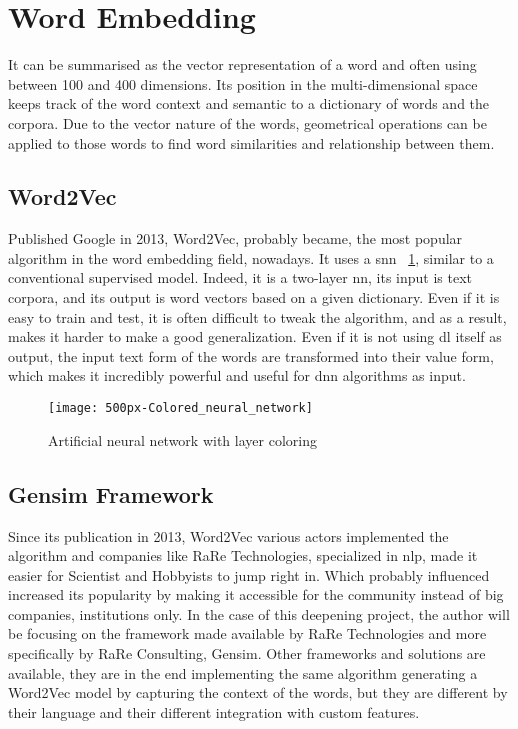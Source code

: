 \section{Word Embedding}
\label{stoa:word-embedding}
It can be summarised as the vector representation of a word and often using between 100 and 400 dimensions. Its position in the multi-dimensional space keeps track of the word context and semantic to a dictionary of words and the corpora. Due to the vector nature of the words, geometrical operations can be applied to those words to find word similarities and relationship between them. 


\subsection{Word2Vec}
\label{stoa:word2vec}
Published Google in 2013, Word2Vec\cite{article:word2vec}, probably became, the most popular algorithm in the word embedding field, nowadays. It uses a \gls{snn} ~\ref{fig:wikipedia_colored_neural_network_img}, similar to a conventional supervised model. Indeed, it is a two-layer \gls{nn}, its input is text corpora, and its output is word vectors based on a given dictionary. Even if it is easy to train and test, it is often difficult to tweak the algorithm, and as a result, makes it harder to make a good generalization. Even if it is not using \gls{dl} itself as output, the input text form of the words are transformed into their value form, which makes it incredibly powerful and useful for \gls{dnn} algorithms as input.

\begin{figure}[ht!]
    \centering
    \texttt{[image: 500px-Colored\_neural\_network]}
    \caption{
       Artificial neural network with layer coloring \cite{wikipedia:colored_neural_network_img}
    }
    \label{fig:wikipedia_colored_neural_network_img}
\end{figure}


\subsection{Gensim Framework}
\label{stoa:gensim}
Since its publication in 2013, Word2Vec\cite{article:word2vec} various actors implemented the algorithm and companies like RaRe Technologies\cite{company:rare-technologies}, specialized in \gls{nlp}, made it easier for Scientist and Hobbyists to jump right in. Which probably influenced increased its popularity by making it accessible for the community instead of big companies, institutions only. In the case of this deepening project, the author will be focusing on the framework made available by RaRe Technologies and more specifically by RaRe Consulting\cite{company:rare-consulting}, Gensim\cite{article:rehurek_lrec}. Other frameworks and solutions are available, they are in the end implementing the same algorithm generating a Word2Vec model by capturing the context of the words, but they are different by their language and their different integration with custom features.\\

